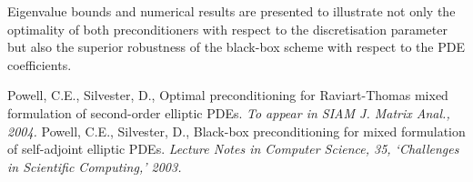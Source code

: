 \documentclass{report}
\begin{document}
Eigenvalue bounds and numerical results are presented to illustrate not
only the optimality of both preconditioners with respect to the
discretisation parameter but also the superior robustness of the
black-box scheme with respect to the PDE coefficients.

\begin{thebibliography}{10}
 Powell, C.E., Silvester, D., Optimal preconditioning for
Raviart-Thomas mixed formulation of second-order elliptic PDEs.
\textit{To appear in SIAM J. Matrix Anal., 2004.}
Powell, C.E., Silvester, D., Black-box preconditioning for
mixed formulation of self-adjoint elliptic PDEs. \textit{Lecture Notes in
Computer Science, 35, `Challenges in Scientific Computing,' 2003.}
\end{thebibliography}
\end{document}

